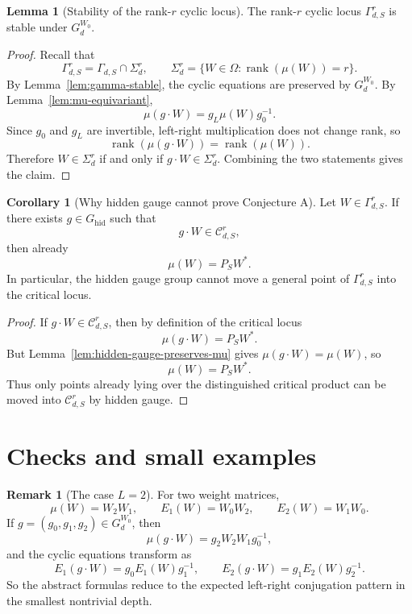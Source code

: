 \documentclass{article}
\newcommand{\rk}{\operatorname{rank}}
\theoremstyle{definition}
\newtheorem{lemma}[theorem]{Lemma}
\newtheorem{corollary}[theorem]{Corollary}
\newtheorem{remark}[theorem]{Remark}
\begin{document}
\begin{lemma}[Stability of the rank-$r$ cyclic locus]\label{lem:gamma-r-stable}
The rank-$r$ cyclic locus $\Gamma_{d,S}^r$ is stable under $G_d^{W_0}$.
\end{lemma}

\begin{proof}
Recall that
\[
\Gamma_{d,S}^r=\Gamma_{d,S}\cap \Sigma_d^r,
\qquad
\Sigma_d^r=\{W\in \Omega : \rk(\mu(W))=r\}.
\]
By Lemma~\ref{lem:gamma-stable}, the cyclic equations are preserved by $G_d^{W_0}$.
By Lemma~\ref{lem:mu-equivariant},
\[
\mu(g\cdot W)=g_L\mu(W)g_0^{-1}.
\]
Since $g_0$ and $g_L$ are invertible, left-right multiplication does not change rank, so
\[
\rk(\mu(g\cdot W))=\rk(\mu(W)).
\]
Therefore $W\in \Sigma_d^r$ if and only if $g\cdot W\in \Sigma_d^r$. Combining the two statements gives the claim.
\end{proof}

\begin{corollary}[Why hidden gauge cannot prove Conjecture A]\label{cor:hidden-gauge-too-small}
Let $W\in \Gamma_{d,S}^r$. If there exists $g\in G_{\mathrm{hid}}$ such that
\[
g\cdot W\in \mathcal C_{d,S}^r,
\]
then already
\[
\mu(W)=P_SW^\ast.
\]
In particular, the hidden gauge group cannot move a general point of $\Gamma_{d,S}^r$ into the critical locus.
\end{corollary}

\begin{proof}
If $g\cdot W\in \mathcal C_{d,S}^r$, then by definition of the critical locus
\[
\mu(g\cdot W)=P_SW^\ast.
\]
But Lemma~\ref{lem:hidden-gauge-preserves-mu} gives $\mu(g\cdot W)=\mu(W)$, so
\[
\mu(W)=P_SW^\ast.
\]
Thus only points already lying over the distinguished critical product can be moved into $\mathcal C_{d,S}^r$ by hidden gauge.
\end{proof}

\section{Checks and small examples}

\begin{remark}[The case $L=2$]
For two weight matrices,
\[
\mu(W)=W_2W_1,
\qquad
E_1(W)=W_0W_2,
\qquad
E_2(W)=W_1W_0.
\]
If $g=(g_0,g_1,g_2)\in G_d^{W_0}$, then
\[
\mu(g\cdot W)=g_2W_2W_1g_0^{-1},
\]
and the cyclic equations transform as
\[
E_1(g\cdot W)=g_0E_1(W)g_1^{-1},
\qquad
E_2(g\cdot W)=g_1E_2(W)g_2^{-1}.
\]
So the abstract formulas reduce to the expected left-right conjugation pattern in the smallest nontrivial depth.
\end{remark}
\end{document}
